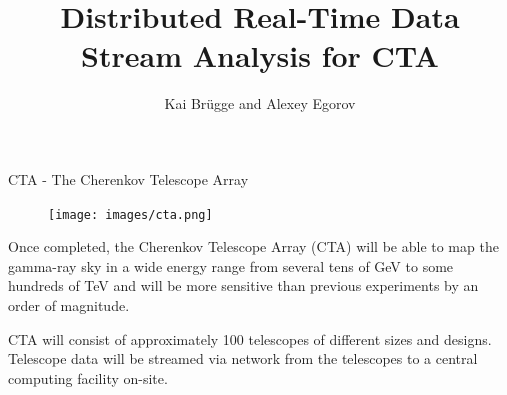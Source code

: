 

\title{Distributed Real-Time Data Stream Analysis for CTA}
\author{Kai Brügge and Alexey Egorov}
\usetikzlibrary{calc}
\usetikzlibrary{shadows.blur}

%

\begin{multicols}{2}
    \begin{block}[]{CTA - The Cherenkov Telescope Array}%
      \begin{multicols}{2}
        \begin{figure}
          \texttt{[image: images/cta.png]}\\
        \end{figure}
        \columnbreak
        Once completed, the  Cherenkov Telescope Array (CTA)  will be able to map the gamma-ray sky
        in a wide energy range from several tens of GeV to some hundreds of TeV and will be more sensitive
        than previous experiments by an order of magnitude.

        CTA will consist of approximately 100 telescopes of different sizes and designs.
        Telescope data will be streamed via network from the telescopes to a central computing facility
        on-site.
      \end{multicols}
    \end{block}%


\end{multicols}
